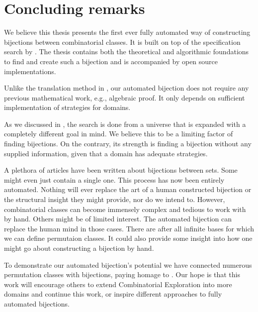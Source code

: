 \section{Concluding remarks}
We believe this thesis presents the first ever fully automated way of constructing bijections between combinatorial classes. It is built on top of the specification search by . The thesis contains both the theoretical and algorithmic foundations to find and create such a bijection and is accompanied by open source implementations.

Unlike the translation method in , our automated bijection does not require any previous mathematical work, e.g., algebraic proof. It only depends on sufficient implementation of strategies for domains.

As we discussed in , the search is done from a universe that is expanded with a completely different goal in mind. We believe this to be a limiting factor of finding bijections. On the contrary, its strength is finding a bijection without any supplied information, given that a domain has adequate strategies.

A plethora of articles have been written about bijections between sets. Some might even just contain a single one. This process has now been entirely automated. Nothing will ever replace the art of a human constructed bijection or the structural insight they might provide, nor do we intend to. However, combinatorial classes can become immensely complex and tedious to work with by hand. Others might be of limited interest. The automated bijection can replace the human mind in those cases. There are after all infinite bases for which we can define permutaion classes. It could also provide some insight into how one might go about constructing a bijection by hand.

To demonstrate our automated bijection's potential we have connected numerous permutation classes with bijections, paying homage to . Our hope is that this work will encourage others to extend Combinatorial Exploration into more domains and continue this work, or inspire different approaches to fully automated bijections.